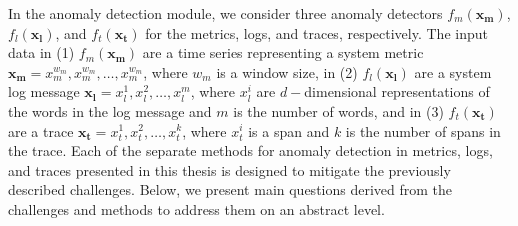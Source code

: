 In the anomaly detection module, we consider three anomaly detectors $f_m(\mathbf{x_m})$, $f_l(\mathbf{x_l})$, and $f_t(\mathbf{x_t})$ for the metrics, logs, and traces, respectively. The input data in (1) $f_m(\mathbf{x_m})$ are a time series representing a system metric $\mathbf{x_m}={x_m^{w_m}, x_m^{w_m}, \dots, x_m^{w_m}}$, where $w_m$ is a window size, in (2) $f_l(\mathbf{x_l})$ are a system log message $\mathbf{x_l}={x_l^1, x_l^2, \dots, x_l^m}$, where $x_l^i$ are $d-$dimensional representations of the words in the log message and $m$ is the number of words, and in (3) $f_t(\mathbf{x_t})$ are a trace $\mathbf{x_t} = {x_t^1, x_t^2, \dots, x_t^k}$, where $x_t^i$ is a span and $k$ is the number of spans in the  trace. 
Each of the separate methods for anomaly detection in metrics, logs, and traces presented in this thesis is designed to mitigate the previously described challenges. Below, we present main questions derived from the challenges and methods to address them on an abstract level.

